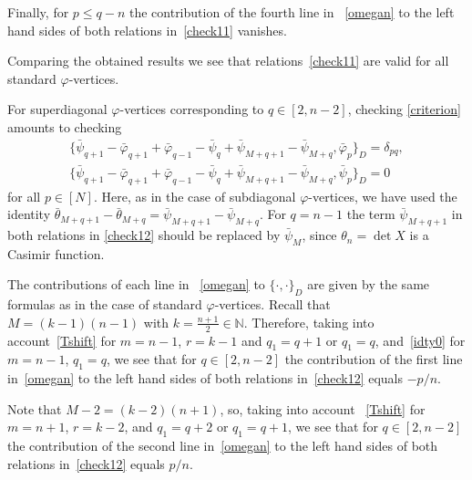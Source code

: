 \documentclass{amsart}
\theoremstyle{definition}
\theoremstyle{remark}
\numberwithin{equation}{section}
\numberwithin{theorem}{section}
\begin{document}
Finally, for $p\le q-n$ the  contribution of the fourth line in ~\eqref{omegan} to the left hand 
sides of  both relations in~\eqref{check11} vanishes.

Comparing the obtained results we see that relations~\eqref{check11} are valid for all standard ${{\varphi}}$-vertices.

For superdiagonal ${{\varphi}}$-vertices corresponding to $q\in [2,n-2]$, checking \eqref{criterion} amounts to checking
\begin{equation}\label{check12}
\begin{gathered}
 \{\bar{{\psi}}_{q+1}-\bar{{\varphi}}_{q+1}+\bar{{\varphi}}_{q-1}-\bar{{\psi}}_q+\bar{{\psi}}_{M+q+1}-\bar{{\psi}}_{M+q},
 \bar{{\varphi}}_p\}_D=\delta_{pq},\\
 \{\bar{{\psi}}_{q+1}-\bar{{\varphi}}_{q+1}+\bar{{\varphi}}_{q-1}-\bar{{\psi}}_q+\bar{{\psi}}_{M+q+1}-\bar{{\psi}}_{M+q},
  \bar{{\psi}}_p\}_D=0
\end{gathered}
\end{equation}
for all $p\in [N]$. Here, as in the case of subdiagonal ${{\varphi}}$-vertices, we have used the identity
$\bar{{\theta}}_{M+q+1}-\bar{{\theta}}_{M+q}= \bar{{\psi}}_{M+q+1}-\bar{{\psi}}_{M+q}$. For $q=n-1$ the term
$\bar{{\psi}}_{M+q+1}$ in both relations in \eqref{check12} should be replaced by $\bar{{\psi}}_M$, since ${{\theta}}_n=\det X$ is a Casimir function.

The contributions of each line in ~\eqref{omegan} to ${{\{\cdot,\cdot\}}}_D$ are given by the same formulas as in the case 
of standard ${{\varphi}}$-vertices. Recall that $M=(k-1)(n-1)$ with
$k=\frac{n+1}2\in{\mathbb N}$. Therefore,
taking into account~\eqref{Tshift} for 
$m=n-1$, $r=k-1$ and $q_1=q+1$ or $q_1=q$, and~\eqref{idty0} for $m=n-1$, $q_1=q$,
we see that for $q\in [2,n-2]$ the contribution of the first line in~\eqref{omegan} to the left hand sides of both relations in~\eqref{check12} equals $-p/n$. 

Note that $M-2=(k-2)(n+1)$, so,  
taking into account ~\eqref{Tshift} for $m=n+1$, $r=k-2$,
and $q_1=q+2$ or $q_1=q+1$,
we see that for $q\in [2,n-2]$ the contribution of the second line in~\eqref{omegan} to the left hand sides of both relations
in~\eqref{check12} equals $p/n$.
\end{document}
